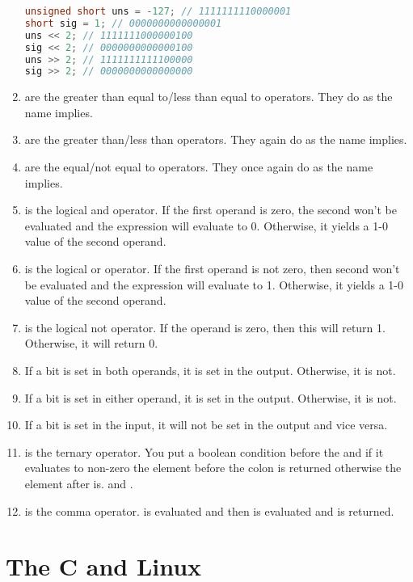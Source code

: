 \begin{enumerate}
	      \begin{lstlisting}[language=C]
unsigned short uns = -127; // 1111111110000001
short sig = 1; // 0000000000000001
uns << 2; // 1111111000000100
sig << 2; // 0000000000000100
uns >> 2; // 1111111111100000
sig >> 2; // 0000000000000000
\end{lstlisting}
	\item \keyword{<=/>=} are the greater than equal to/less than equal to operators. They do as the name implies.
	\item \keyword{</>} are the greater than/less than operators. They again do as the name implies.
	\item \keyword{==/\!=} are the equal/not equal to operators. They once again do as the name implies.
	\item \keyword{\&\&} is the logical and operator. If the first operand is zero, the second won't be evaluated and the expression will evaluate to 0. Otherwise, it yields a 1-0 value of the second operand.
	\item \keyword{||} is the logical or operator. If the first operand is not zero, then second won't be evaluated and the expression will evaluate to 1. Otherwise, it yields a 1-0 value of the second operand.
	\item \keyword{!} is the logical not operator. If the operand is zero, then this will return 1. Otherwise, it will return 0.
	\item \keyword{\&} If a bit is set in both operands, it is set in the output. Otherwise, it is not.
	\item \keyword{|} If a bit is set in either operand, it is set in the output. Otherwise, it is not.
	\item \keyword{~~} If a bit is set in the input, it will not be set in the output and vice versa.
	\item {} is the ternary operator. You put a boolean condition before the \? and if it evaluates to non-zero the element before the colon is returned otherwise the element after is.  and .
	\item {} is the comma operator.  is evaluated and then  is evaluated and  is returned.
\end{enumerate}

\section{The C and Linux}

